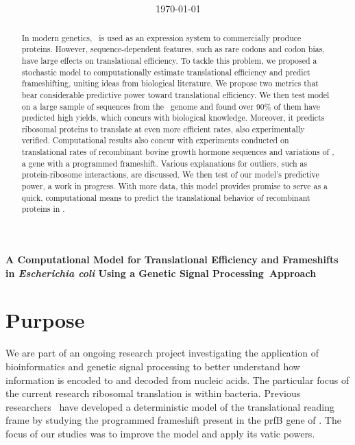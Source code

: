 \documentclass[12pt]{article}
\author{\sc{\BWFauthors}}
\date{{\sc \today}}
\title{\bf{\BWFtitle{\emph}}}
\newcommand{\BWFtitle}[2]{A Computational Model for Translational
  Efficiency and Frameshifts in #1{Escherichia coli} Using a Genetic Signal
  Processing#2Approach}
\begin{document}
\begin{singlespace}
  \tableofcontents
\end{singlespace}

\clearpage
\begin{Large}
\noindent\textbf{\BWFtitle{\emph}{~}}
\end{Large}
\begin{abstract}\begin{normalsize}
  In modern genetics, \ecoli\ is used as an expression system to commercially
  produce proteins.  However, sequence-dependent
  features, such as rare codons and codon bias, have large effects on translational
  efficiency.  To tackle this problem, we proposed a stochastic model to computationally estimate
  translational efficiency and predict frameshifting, uniting ideas from biological literature.
  We propose two metrics that bear considerable predictive power toward translational efficiency.
  We then test model on a large sample of sequences from the \ecoli\ genome and
  found over 90\% of them have predicted high yields, which concurs
  with biological knowledge.
  Moreover, it predicts ribosomal proteins
  to translate at even more efficient rates, also experimentally verified.
  Computational results also concur with experiments conducted on translational
  rates of recombinant bovine growth hormone sequences and variations of \prfB, a gene
  with a programmed frameshift. Various explanations for outliers, such as protein-ribosome
  interactions, are discussed. We then test of our model's predictive
  power, a work in progress.  With more data, this model provides
  promise to serve as a quick, computational means to predict the
  translational behavior of recombinant proteins in \ecoli.
\end{normalsize}\end{abstract}  
  
\clearpage
{}

\section{Purpose}
We are part of an ongoing research project
investigating the application of bioinformatics
and genetic signal processing to better understand how
information is encoded to and decoded from nucleic acids.  The particular
focus of the current research ribosomal translation is within
bacteria.  Previous researchers~\cite{lalit:mechanics}
have developed a deterministic model
of the translational reading frame by studying the
programmed frameshift present in the prfB gene of \ecoli.  The focus
of our studies was to improve the model and apply its vatic powers.
\end{document}
